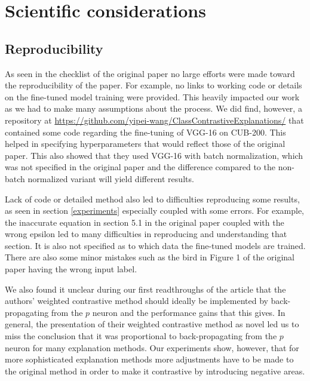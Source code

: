 \section{Scientific considerations} %

\subsection{Reproducibility}
As seen in the checklist of the original paper no large efforts were made toward the reproducibility of the paper. For example, no links to working code or details on the fine-tuned model training were provided. This heavily impacted our work as we had to make many assumptions about the process. We did find, however, a repository at \href{https://github.com/yipei-wang/ClassContrastiveExplanations/}{https://github.com/yipei-wang/ClassContrastiveExplanations/} that contained some code regarding the fine-tuning of VGG-16 on CUB-200. This helped in specifying hyperparameters that would reflect those of the original paper. This also showed that they used VGG-16 with batch normalization, which was not specified in the original paper and the difference compared to the non-batch normalized variant will yield different results.

Lack of code or detailed method also led to difficulties reproducing some results, as seen in section \ref{experiments} especially coupled with some errors. For example, the inaccurate equation in section 5.1 in the original paper coupled with the wrong epsilon led to many difficulties in reproducing and understanding that section. It is also not specified as to which data the fine-tuned models are trained. There are also some minor mistakes such as the bird in Figure 1 of the original paper having the wrong input label.

We also found it unclear during our first readthroughs of the article that the authors' weighted contrastive method should ideally be implemented by back-propagating from the $p$ neuron and the performance gains that this gives. In general, the presentation of their weighted contrastive method as novel led us to miss the conclusion that it was proportional to back-propagating from the $p$ neuron for many explanation methods. Our experiments show, however, that for more sophisticated explanation methods more adjustments have to be made to the original method in order to make it contrastive by introducing negative areas.


